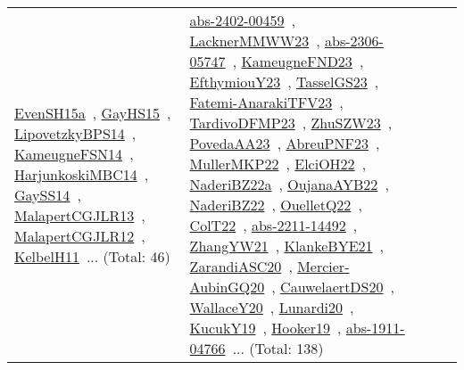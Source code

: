 {\begin{longtable}{lp{3cm}>{\raggedright\arraybackslash}p{6cm}>{\raggedright\arraybackslash}p{6cm}>{\raggedright\arraybackslash}p{8cm}}
\href{../works/EvenSH15a.pdf}{EvenSH15a}~\cite{EvenSH15a}, \href{../works/GayHS15.pdf}{GayHS15}~\cite{GayHS15}, \href{../works/LipovetzkyBPS14.pdf}{LipovetzkyBPS14}~\cite{LipovetzkyBPS14}, \href{../works/KameugneFSN14.pdf}{KameugneFSN14}~\cite{KameugneFSN14}, \href{../works/HarjunkoskiMBC14.pdf}{HarjunkoskiMBC14}~\cite{HarjunkoskiMBC14}, \href{../works/GaySS14.pdf}{GaySS14}~\cite{GaySS14}, \href{../works/MalapertCGJLR13.pdf}{MalapertCGJLR13}~\cite{MalapertCGJLR13}, \href{../works/MalapertCGJLR12.pdf}{MalapertCGJLR12}~\cite{MalapertCGJLR12}, \href{../works/KelbelH11.pdf}{KelbelH11}~\cite{KelbelH11}... (Total: 46) & \href{../works/abs-2402-00459.pdf}{abs-2402-00459}~\cite{abs-2402-00459}, \href{../works/LacknerMMWW23.pdf}{LacknerMMWW23}~\cite{LacknerMMWW23}, \href{../works/abs-2306-05747.pdf}{abs-2306-05747}~\cite{abs-2306-05747}, \href{../works/KameugneFND23.pdf}{KameugneFND23}~\cite{KameugneFND23}, \href{../works/EfthymiouY23.pdf}{EfthymiouY23}~\cite{EfthymiouY23}, \href{../works/TasselGS23.pdf}{TasselGS23}~\cite{TasselGS23}, \href{../works/Fatemi-AnarakiTFV23.pdf}{Fatemi-AnarakiTFV23}~\cite{Fatemi-AnarakiTFV23}, \href{../works/TardivoDFMP23.pdf}{TardivoDFMP23}~\cite{TardivoDFMP23}, \href{../works/ZhuSZW23.pdf}{ZhuSZW23}~\cite{ZhuSZW23}, \href{../works/PovedaAA23.pdf}{PovedaAA23}~\cite{PovedaAA23}, \href{../works/AbreuPNF23.pdf}{AbreuPNF23}~\cite{AbreuPNF23}, \href{../works/MullerMKP22.pdf}{MullerMKP22}~\cite{MullerMKP22}, \href{../works/ElciOH22.pdf}{ElciOH22}~\cite{ElciOH22}, \href{../works/NaderiBZ22a.pdf}{NaderiBZ22a}~\cite{NaderiBZ22a}, \href{../works/OujanaAYB22.pdf}{OujanaAYB22}~\cite{OujanaAYB22}, \href{../works/NaderiBZ22.pdf}{NaderiBZ22}~\cite{NaderiBZ22}, \href{../works/OuelletQ22.pdf}{OuelletQ22}~\cite{OuelletQ22}, \href{../works/ColT22.pdf}{ColT22}~\cite{ColT22}, \href{../works/abs-2211-14492.pdf}{abs-2211-14492}~\cite{abs-2211-14492}, \href{../works/ZhangYW21.pdf}{ZhangYW21}~\cite{ZhangYW21}, \href{../works/KlankeBYE21.pdf}{KlankeBYE21}~\cite{KlankeBYE21}, \href{../works/ZarandiASC20.pdf}{ZarandiASC20}~\cite{ZarandiASC20}, \href{../works/Mercier-AubinGQ20.pdf}{Mercier-AubinGQ20}~\cite{Mercier-AubinGQ20}, \href{../works/CauwelaertDS20.pdf}{CauwelaertDS20}~\cite{CauwelaertDS20}, \href{../works/WallaceY20.pdf}{WallaceY20}~\cite{WallaceY20}, \href{../works/Lunardi20.pdf}{Lunardi20}~\cite{Lunardi20}, \href{../works/KucukY19.pdf}{KucukY19}~\cite{KucukY19}, \href{../works/Hooker19.pdf}{Hooker19}~\cite{Hooker19}, \href{../works/abs-1911-04766.pdf}{abs-1911-04766}~\cite{abs-1911-04766}... (Total: 138)\\

\end{longtable}}
